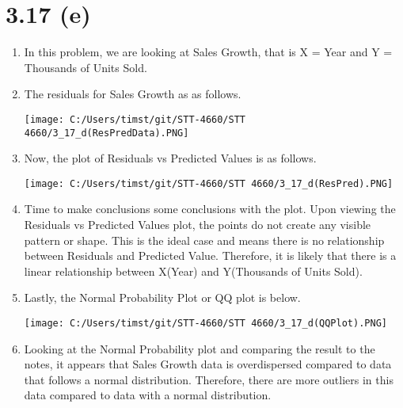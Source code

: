 \documentclass{article}
\begin{document}
\section*{3.17 (e)}
	\begin{enumerate}[label = \arabic*)]
		\item In this problem, we are looking at Sales Growth, that is X = Year and Y = Thousands of Units Sold.
		\item The residuals for Sales Growth as as follows.
		
		\texttt{[image: C:/Users/timst/git/STT-4660/STT 4660/3\_17\_d(ResPredData).PNG]}
		\item Now, the plot of Residuals vs Predicted Values is as follows.
		
		\texttt{[image: C:/Users/timst/git/STT-4660/STT 4660/3\_17\_d(ResPred).PNG]}
		\item Time to make conclusions some conclusions with the plot.
		Upon viewing the Residuals vs Predicted Values plot, the points do not create any visible pattern or shape. This is the ideal case and means there is no relationship between Residuals and Predicted Value. Therefore, it is likely that there is a linear relationship between X(Year) and Y(Thousands of Units Sold).
		
		\item Lastly, the Normal Probability Plot or QQ plot is below.
		
		\texttt{[image: C:/Users/timst/git/STT-4660/STT 4660/3\_17\_d(QQPlot).PNG]}
		\item Looking at the Normal Probability plot and comparing the result to the notes, it appears that Sales Growth data is overdispersed compared to data that follows a normal distribution. Therefore, there are more outliers in this data compared to data with a normal distribution.
	\end{enumerate}
\end{document}
